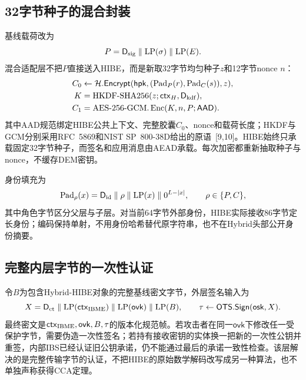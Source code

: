 \documentclass[UTF8,a4paper,12pt,oneside,openany,fontset=fandol]{ctexrep}
\begin{document}
\subsection{32字节种子的混合封装}
基线载荷改为
\[
 P=\mathsf D_{\rm sig}\parallel\mathrm{LP}(\sigma)\parallel\mathrm{LP}(E).
\]
混合适配层不把\(P\)直接送入HIBE，而是新取32字节均匀种子\(z\)和12字节nonce \(n\)：
\begin{align*}
 C_0&\leftarrow\mathcal H.\mathsf{Encrypt}
   (\mathsf{hpk},(\operatorname{Pad}_P(r),\operatorname{Pad}_C(s)),z),\\
 K&=\operatorname{HKDF\text{-}SHA256}
   (z;\mathsf{ctx}_H,\mathsf D_{\rm kdf}),\\
 C_1&=\operatorname{AES\text{-}256\text{-}GCM.Enc}
   (K,n,P;\mathsf{AAD}).
\end{align*}
其中AAD规范绑定HIBE公共上下文、完整胶囊\(C_0\)、nonce和载荷长度；HKDF与GCM分别采用RFC~5869和NIST SP~800-38D给出的原语~[9,10]。HIBE始终只承载固定32字节种子，而签名和应用消息由AEAD承载。每次加密都重新抽取种子与nonce，不缓存DEM密钥。

身份填充为
\[
 \operatorname{Pad}_{\rho}(x)=\mathsf D_{\rm id}\parallel\rho
   \parallel\mathrm{LP}(x)\parallel 0^{L-|x|},
 \qquad \rho\in\{P,C\},
\]
其中角色字节区分父层与子层。对当前64字节外部身份，HIBE实际接收86字节定长身份；编码保持单射，不用身份哈希替代原字符串，也不在Hybrid头部公开身份摘要。

\subsection{完整内层字节的一次性认证}
令\(B\)为包含Hybrid-HIBE对象的完整基线密文字节，外层签名输入为
\[
 X=\mathsf D_{\rm ct}\parallel\mathrm{LP}(\mathsf{ctx}_{\rm IBME})
   \parallel\mathrm{LP}(\mathsf{ovk})\parallel\mathrm{LP}(B),
 \qquad \tau\leftarrow\mathsf{OTS.Sign}(\mathsf{osk},X).
\]
最终密文是\(\mathsf{ctx}_{\rm IBME},\mathsf{ovk},B,\tau\)的版本化规范帧。若攻击者在同一\(\mathsf{ovk}\)下修改任一受保护字节，需要伪造一次性签名；若持有接收密钥的实体换一把新的一次性公钥并重签，内部IBS已经认证旧公钥承诺，仍不能通过最后的承诺一致性检查。该层解决的是完整传输字节的认证，不把HIBE的原始数学解码改写成另一种算法，也不单独声称获得CCA定理。
\end{document}

